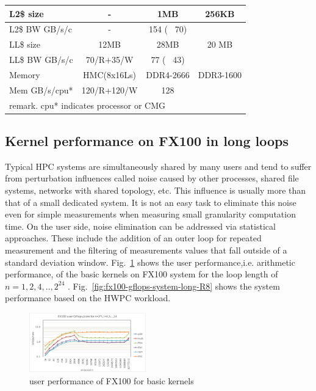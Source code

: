 \documentclass[conference]{IEEEtran}
\begin{document}
\begin{table}[tb]
\begin{tabular}{l|c|c|c}
L2\$ size		&	-			&	1MB	&	256KB	\\ \hline
L2\$ BW GB/s/c	&	-			&	154 ( ~70)	\\ \hline
LL\$ size		&	12MB		&	28MB	&	20 MB	\\ \hline
LL\$ BW GB/s/c	&	70/R+35/W	&	77 ( ~43)	\\ \hline
Memory			&	HMC(8x16Ls)	&	DDR4-2666	& DDR3-1600	\\ \hline
Mem GB/s/cpu*	&	120/R+120/W	&	128	\\ \hline
\multicolumn{4}{l}{\scriptsize\hspace{5mm} remark. cpu* indicates processor or CMG }\\
\end{tabular}
\fi
\end{table}


\subsection{Kernel performance on FX100 in long loops}
\label{subsection:long-kernels-fx100}
%
%
%
%
Typical HPC systems are simultaneously shared by many users and tend to
suffer from perturbation influences called noise caused by other processes,
shared file systems, networks with shared topology, etc.
This influence is usually more than that of a small dedicated system.
It is not an easy task to eliminate this noise even for simple measurements 
when measuring small granularity computation time.
On the user side, noise elimination can be addressed via statistical
approaches. These include the addition of an outer loop for repeated
measurement and the filtering of measurements values that fall outside of
a standard deviation window.
\fi
%
%
Fig.~\ref{fig:fx100-gflops-user-long-R8} shows the 
user performance,i.e. arithmetic performance, of the basic kernels
on FX100 system
for the loop length of
\begin{math}
n=1,2,4,..,2^{24}
\end{math}
.
Fig.~\ref{fig:fx100-gflops-system-long-R8} shows the 
system performance based on the HWPC workload.

\begin{figure}[tb]
\centering
\includegraphics[width=0.45\textwidth]{figs/fx100-gflops-user-long-R8.pdf}
\caption{user performance of FX100 for basic kernels}
\label{fig:fx100-gflops-user-long-R8}
\end{figure}
\end{document}
